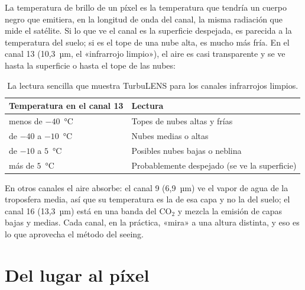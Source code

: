 La temperatura de brillo de un píxel es la temperatura que tendría un cuerpo negro que emitiera, en la longitud de onda
del canal, la misma radiación que mide el satélite. Si lo que ve el canal es la superficie despejada, es parecida a la
temperatura del suelo; si es el tope de una nube alta, es mucho más fría. En el canal 13 (10,3~µm, el «infrarrojo
limpio»), el aire es casi transparente y se ve hasta la superficie o hasta el tope de las nubes:

\begin{table}[H]
\centering\small
\begin{tabular}{@{}l l@{}}
\toprule
Temperatura en el canal 13 & Lectura\\
\midrule
menos de $-40$~°C & Topes de nubes altas y frías\\
de $-40$ a $-10$~°C & Nubes medias o altas\\
de $-10$ a $5$~°C & Posibles nubes bajas o neblina\\
más de $5$~°C & Probablemente despejado (se ve la superficie)\\
\bottomrule
\end{tabular}
\caption{La lectura sencilla que muestra TurbuLENS para los canales infrarrojos limpios.}
\end{table}

En otros canales el aire absorbe: el canal 9 (6,9~µm) ve el vapor de agua de la troposfera media, así que su temperatura
es la de esa capa y no la del suelo; el canal 16 (13,3~µm) está en una banda del CO$_2$ y mezcla la emisión de capas bajas
y medias. Cada canal, en la práctica, «mira» a una altura distinta, y eso es lo que aprovecha el método del seeing.

\section{Del lugar al píxel}

